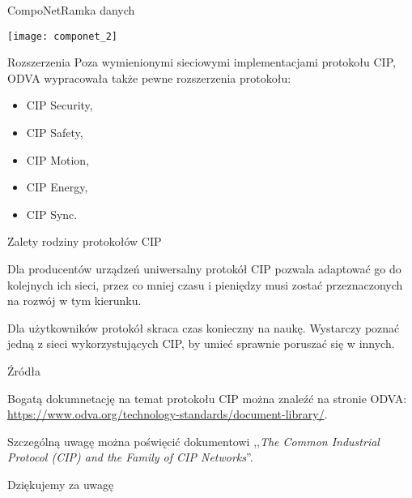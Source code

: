 \documentclass[11pt]{beamer}
\begin{document}
\begin{frame}{CompoNet}{Ramka danych}

\begin{center}
	\texttt{[image: componet\_2]}
\end{center}
\end{frame}


\begin{frame}{Rozszerzenia}
Poza wymienionymi sieciowymi implementacjami protokołu CIP, ODVA wypracowała także pewne rozszerzenia protokołu:
\begin{itemize}
\item CIP Security,
\item CIP Safety,
\item CIP Motion,
\item CIP Energy,
\item CIP Sync.
\end{itemize}
\end{frame}


\begin{frame}{Zalety rodziny protokołów CIP}

Dla producentów urządzeń uniwersalny protokół CIP pozwala adaptować go do kolejnych ich sieci, przez co mniej czasu i pieniędzy musi zostać przeznaczonych na rozwój w tym kierunku.

\vspace{0.5cm}

Dla użytkowników protokół skraca czas konieczny na naukę. Wystarczy poznać jedną z sieci wykorzystujących CIP, by umieć sprawnie poruszać się w innych.
\end{frame}


\begin{frame}{Źródła}

Bogatą dokumnetację na temat protokołu CIP można znaleźć na stronie ODVA:
\href{https://www.odva.org/technology-standards/document-library/}{https://www.odva.org/technology-standards/document-library/}.

\vspace{0.5cm}

Szczególną uwagę można poświęcić dokumentowi ,,\emph{The Common Industrial Protocol (CIP) and the Family of CIP Networks}''.

\end{frame}

\begin{frame}

\begin{center}
{\LARGE Dziękujemy za uwagę}
\end{center}

\end{frame}
\end{document}
